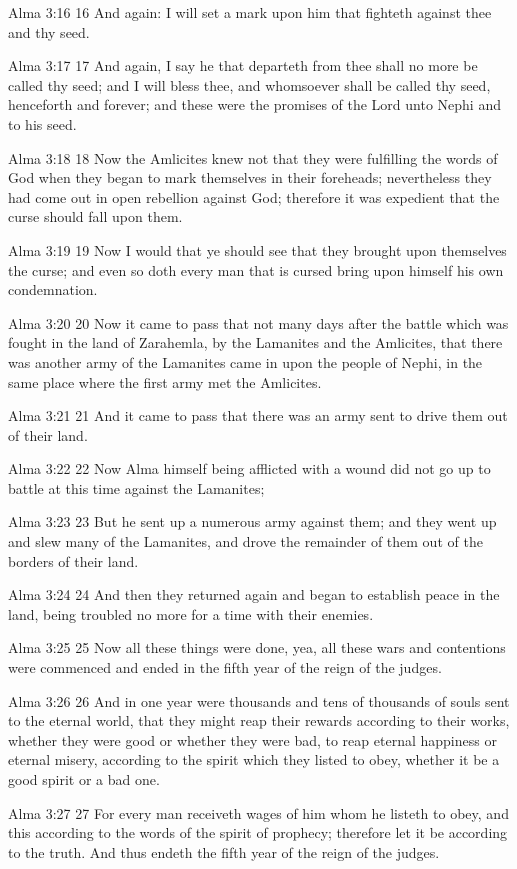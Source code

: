 Alma 3:16
 16 And again: I will set a mark upon him that fighteth against
thee and thy seed.

Alma 3:17
 17 And again, I say he that departeth from thee shall no more be
called thy seed; and I will bless thee, and whomsoever shall be
called thy seed, henceforth and forever; and these were the
promises of the Lord unto Nephi and to his seed.

Alma 3:18
 18 Now the Amlicites knew not that they were fulfilling the
words of God when they began to mark themselves in their
foreheads; nevertheless they had come out in open rebellion
against God; therefore it was expedient that the curse should
fall upon them.

Alma 3:19
 19 Now I would that ye should see that they brought upon
themselves the curse; and even so doth every man that is cursed
bring upon himself his own condemnation.

Alma 3:20
 20 Now it came to pass that not many days after the battle which
was fought in the land of Zarahemla, by the Lamanites and the
Amlicites, that there was another army of the Lamanites came in
upon the people of Nephi, in the same place where the first army
met the Amlicites.

Alma 3:21
 21 And it came to pass that there was an army sent to drive them
out of their land.

Alma 3:22
 22 Now Alma himself being afflicted with a wound did not go up
to battle at this time against the Lamanites;

Alma 3:23
 23 But he sent up a numerous army against them; and they went up
and slew many of the Lamanites, and drove the remainder of them
out of the borders of their land.

Alma 3:24
 24 And then they returned again and began to establish peace in
the land, being troubled no more for a time with their enemies.

Alma 3:25
 25 Now all these things were done, yea, all these wars and
contentions were commenced and ended in the fifth year of the
reign of the judges.

Alma 3:26
 26 And in one year were thousands and tens of thousands of souls
sent to the eternal world, that they might reap their rewards
according to their works, whether they were good or whether they
were bad, to reap eternal happiness or eternal misery, according
to the spirit which they listed to obey, whether it be a good
spirit or a bad one.

Alma 3:27
 27 For every man receiveth wages of him whom he listeth to obey,
and this according to the words of the spirit of prophecy;
therefore let it be according to the truth. And thus endeth the
fifth year of the reign of the judges.

